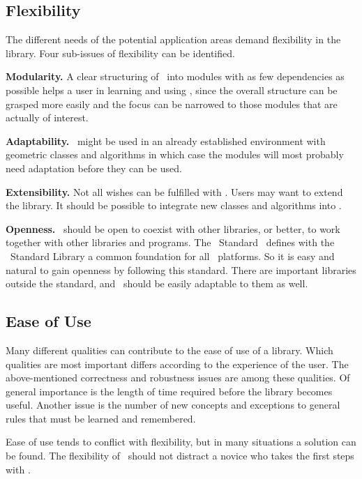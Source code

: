 \subsection*{Flexibility}
The different needs of the potential application areas demand 
flexibility in the library. Four sub-issues of flexibility can be identified.

{\bf Modularity.}
A clear structuring of \cgal\ into modules with as few dependencies as
possible helps a user in learning and using \cgal, since the overall
structure can be grasped more easily and the focus can be narrowed to
those modules that are actually of interest. 

{\bf Adaptability.}
\cgal\ might be used in an already established environment with
geometric classes and algorithms in which case the modules will 
most probably need adaptation before they can be used. 

{\bf Extensibility.}
Not all wishes can be fulfilled with \cgal. Users may want to
extend the library. It should be possible to integrate new 
classes and algorithms into \cgal.

{\bf Openness.}
\cgal\ should be open to coexist with other libraries, or better, to
work together with other libraries and programs. The \CC\ 
Standard~\cite{cgal:ansi-is14882-98}
\ccIndexMainItem{\stl}
defines with the \CC\ Standard Library a common
foundation for all \CC\ platforms. 
So it is easy and natural to gain openness by following this standard.
There are important libraries outside the standard, and \cgal\
should be easily adaptable to them as well.

\subsection*{Ease of Use}
Many different qualities can contribute to the ease of use of a
library. Which qualities are most important differs according to 
the experience of the user.
The above-mentioned correctness and robustness issues are among
these qualities. Of general importance is the length of time required
before the library becomes useful. Another issue is the number of 
new concepts and
exceptions to general rules that must be learned and remembered.

Ease of use tends to conflict with flexibility, but in many
situations a solution can be found.
The flexibility of \cgal\ should not distract a novice who takes the 
first steps with \cgal.
\ccIndexSubitem{ease of use}{vs. flexibility}

